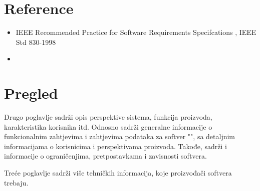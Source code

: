 \section{Reference}

\begin{itemize}
\item IEEE Recommended Practice for Software Requirements Specifcations , IEEE Std 830-1998
\item 
\end{itemize}
\section{Pregled}

Drugo poglavlje sadrži opis perspektive sistema, funkcija proizvoda, karakteristika korisnika itd.
Odnosno sadrži generalne informacije o funkcionalnim zahtjevima i zahtjevima podataka za softver "\naziv", sa detaljnim informacijama o korisnicima i perspektivama proizvoda. Takođe, sadrži i informacije o ograničenjima, pretpostavkama i zavisnosti softvera.

Treće poglavlje sadrži više tehničkih informacija, koje proizvođači softvera trebaju.


